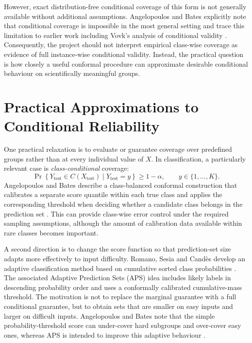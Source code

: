 \documentclass[12pt,a4paper]{article}
\begin{document}
However, exact distribution-free conditional coverage of this form is not generally available without additional assumptions. Angelopoulos and Bates explicitly note that conditional coverage is impossible in the most general setting and trace this limitation to earlier work including Vovk's analysis of conditional validity \cite{angelopoulos2023gentle,vovk2012conditional}. Consequently, the project should not interpret empirical class-wise coverage as evidence of full instance-wise conditional validity. Instead, the practical question is how closely a useful conformal procedure can approximate desirable conditional behaviour on scientifically meaningful groups.

\section{Practical Approximations to Conditional Reliability}

One practical relaxation is to evaluate or guarantee coverage over predefined groups rather than at every individual value of $X$. In classification, a particularly relevant case is \emph{class-conditional} coverage:
\begin{equation}
    \Pr\!\left\{Y_{\mathrm{test}}\in C(X_{\mathrm{test}})\mid Y_{\mathrm{test}}=y\right\}
    \geq 1-\alpha,
    \qquad y\in\{1,\ldots,K\}.
    \label{eq:classconditional}
\end{equation}
Angelopoulos and Bates describe a class-balanced conformal construction that calibrates a separate score quantile within each true class and applies the corresponding threshold when deciding whether a candidate class belongs in the prediction set \cite{angelopoulos2023gentle}. This can provide class-wise error control under the required sampling assumptions, although the amount of calibration data available within rare classes becomes important.

A second direction is to change the score function so that prediction-set size adapts more effectively to input difficulty. Romano, Sesia and Cand\`es develop an adaptive classification method based on cumulative sorted class probabilities \cite{romano2020classification}. The associated Adaptive Prediction Sets (APS) idea includes likely labels in descending probability order and uses a conformally calibrated cumulative-mass threshold. The motivation is not to replace the marginal guarantee with a full conditional guarantee, but to obtain sets that are smaller on easy inputs and larger on difficult inputs. Angelopoulos and Bates note that the simple probability-threshold score can under-cover hard subgroups and over-cover easy ones, whereas APS is intended to improve this adaptive behaviour \cite{angelopoulos2023gentle}.
\end{document}
